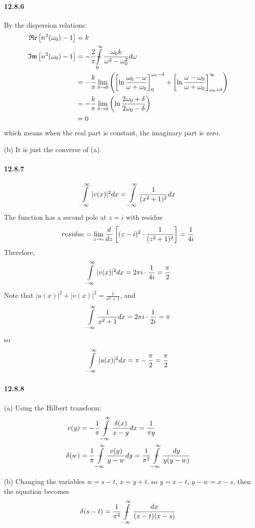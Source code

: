 \documentclass[a4paper]{article}
\begin{document}
\paragraph{12.8.6}
By the dispersion relations:
\begin{equation*}
    \begin{split}
        \mathfrak{Re}\lfbr{n^2(\omega_0)-1 }& =k\\
        \mathfrak{Im}\lfbr{n^2(\omega_0)-1 }& =-\frac{2}{\pi}\dashint\displaylimits_0^\infty\frac{\omega_0k}{\omega^2-\omega_0^2}d\omega\\
        & =-\frac{k}{\pi}\lim_{\delta\to0}\lfpr{\lfbr{\ln\frac{\omega_0-\omega}{\omega+\omega_0} }_0^{\omega_0-\delta}+\lfbr{\ln\frac{\omega-\omega_0}{\omega+\omega_0}}_{\omega_0+\delta}^\infty}\\
        & =-\frac{k}{\pi}\lim_{\delta\to0}\left(\ln\frac{2\omega_0+\delta}{2\omega_0-\delta}\right)\\
        & =0
    \end{split}
\end{equation*}
which means when the real part is constant, the imaginary part is zero.
\medskip

(b)
It is just the converse of (a).

\paragraph{12.8.7}
\[
\int\displaylimits_{-\infty}^\infty |v(x)|^2dx=\int\displaylimits_{-\infty}^\infty\frac{1}{(x^2+1)^2}dx
\]
The function has a second pole at $z=i$ with residue
\[
residue=\lim_{z\to i}\frac{d}{dz}\left[(z-i)^2\cdot\frac{1}{(z^2+1)^2} \right]=\frac{1}{4i}
\]
Therefore,
\[
\int\displaylimits_{-\infty}^\infty|v(x)|^2dx=2\pi i\cdot\frac{1}{4i}=\frac{\pi}{2}
\]
Note that $|u(x)|^2+|v(x)|^2=\frac{1}{x^2+1}$, and
\[
\int\displaylimits_{-\infty}^\infty\frac{1}{x^2+1}dx=2\pi i\cdot\frac{1}{2i}=\pi
\]
so 
\[
\int\displaylimits_{-\infty}^\infty|u(x)|^2dx=\pi-\frac{\pi}{2}=\frac{\pi}{2}
\]

\paragraph{12.8.8}
(a)
Using the Hilbert transform:
\begin{equation*}
    \begin{split}
        v(y)& =-\frac{1}{\pi}\ddashint\displaylimits_{-\infty}^\infty\frac{\delta(x)}{x-y}dx=\frac{1}{\pi y}\\
        \delta(w)& =\frac{1}{\pi}\ddashint\displaylimits_{-\infty}^\infty\frac{v(y)}{y-w}dy=\frac{1}{\pi^2}\ddashint\displaylimits_{-\infty}^\infty\frac{dy}{y(y-w)}
    \end{split}
\end{equation*}

(b)
Changing the variables $w=s-t$,\; $x=y+t$, so $y=x-t$,\; $y-w=x-s$, then the equation becomes
\[
\delta(s-t)=\frac{1}{\pi^2}\ddashint\displaylimits_{-\infty}^\infty\frac{dx}{(x-t)(x-s)}
\]
\end{document}
